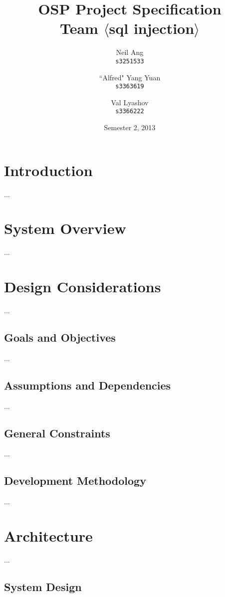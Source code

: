 \documentclass[11pt,a4paper,titlepage]{report}
\title{OSP Project Specification \\ Team $\langle$sql injection$\rangle$}
\author{
  Neil Ang\\
  \texttt{s3251533}
  \and
  ``Alfred" Yang Yuan\\
  \texttt{s3363619}
  \and
  Val Lyashov\\
  \texttt{s3366222}
}
\date{Semester 2, 2013}
\begin{document}
\maketitle

\pagebreak
\tableofcontents
\thispagestyle{empty}
\pagebreak

\section{Introduction}

...

\section{System Overview}

...

\section{Design Considerations}

...

\subsection{Goals and Objectives}

...

\subsection{Assumptions and Dependencies}

...

\subsection{General Constraints}

...

\subsection{Development Methodology}

...

\section{Architecture}

...

\subsection{System Design}
\end{document}
